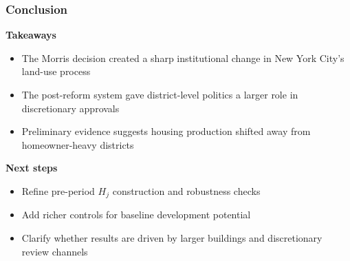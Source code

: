 
\begin{frame}
    \frametitle{Conclusion}
    \small

    \textbf{Takeaways}
    \begin{itemize}
        \item The Morris decision created a sharp institutional change in New York City's land-use process
        \item The post-reform system gave district-level politics a larger role in discretionary approvals
        \item Preliminary evidence suggests housing production shifted away from homeowner-heavy districts
    \end{itemize}

    \vspace{0.25em}
    \textbf{Next steps}
    \begin{itemize}
        \item Refine pre-period \(H_j\) construction and robustness checks
        \item Add richer controls for baseline development potential
        \item Clarify whether results are driven by larger buildings and discretionary review channels
    \end{itemize}
\end{frame}
